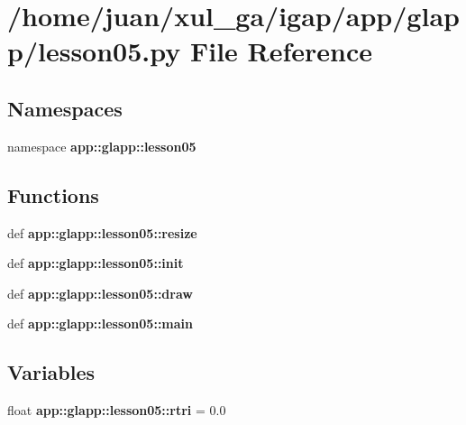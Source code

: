 \section{/home/juan/xul\_\-ga/igap/app/glapp/lesson05.py File Reference}
\label{lesson05_8py}
\subsection*{Namespaces}
\begin{CompactItemize}
\item 
namespace {\bf app::glapp::lesson05}
\end{CompactItemize}
\subsection*{Functions}
\begin{CompactItemize}
\item 
def {\bf app::glapp::lesson05::resize}
\item 
def {\bf app::glapp::lesson05::init}
\item 
def {\bf app::glapp::lesson05::draw}
\item 
def {\bf app::glapp::lesson05::main}
\end{CompactItemize}
\subsection*{Variables}
\begin{CompactItemize}
\item 
float {\bf app::glapp::lesson05::rtri} = 0.0
\end{CompactItemize}
